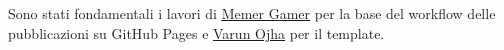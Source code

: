 Sono stati fondamentali i lavori di \href{https://github.com/MemerGamer/LaTex-Publishing}{\underline{Memer Gamer}} per la base del workflow delle pubblicazioni su GitHub Pages e \href{https://www.overleaf.com/latex/templates/university-of-reading-computer-science-report-template-and-guide/xhttddjhkwrf}{\underline{Varun Ojha}} per il template.



